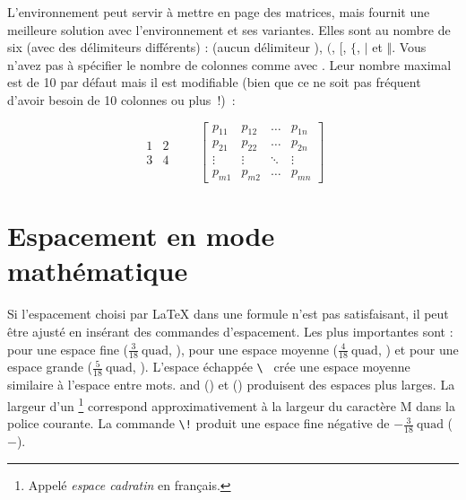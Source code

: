 L'environnement  peut servir à mettre en page des
matrices, mais  fournit une meilleure
solution avec l'environnement  et ses variantes. Elles sont au
nombre de six (avec des délimiteurs différents) :  (aucun
délimiteur ), 
$($,  $[$,  $\{$,  $\vert$ et
 $\Vert$. Vous n'avez pas à spécifier le nombre de
colonnes comme avec . Leur nombre maximal est de 10 par défaut mais il
est modifiable (bien que ce ne soit pas fréquent d'avoir besoin de 10
colonnes ou plus~!)~:
\begin{example}
\begin{equation*}
  \begin{matrix} 
    1 & 2 \\
    3 & 4 
  \end{matrix} \qquad
  \begin{bmatrix} 
    p_{11} & p_{12} & \ldots 
    & p_{1n} \\
    p_{21} & p_{22} & \ldots 
    & p_{2n} \\
    \vdots & \vdots & \ddots 
    & \vdots \\
    p_{m1} & p_{m2} & \ldots 
    & p_{mn} 
  \end{bmatrix}
\end{equation*}
\end{example}

\section{Espacement en mode mathématique}
\label{sec:math-spacing}


Si l'espacement choisi par \LaTeX{} dans une formule n'est pas
satisfaisant, il peut être ajusté en insérant des commandes
d'espacement. Les plus importantes sont : \ci{,} pour une espace fine
($\frac{3}{18}\:\textrm{quad}$, \demowidth{0.166em}), \ci{:} pour une
espace moyenne ($\frac{4}{18}\:\textrm{quad}$, \demowidth{0.222em}) et
\ci{;} pour une espace grande ($\frac{5}{18}\: \textrm{quad}$,
\demowidth{0.277em}).  L'espace échappée \verb*|\ | crée une espace
moyenne similaire à l'espace entre mots. and 
(\demowidth{1em}) et  (\demowidth{2em}) produisent des
espaces plus larges.  La largeur d'un \footnote{Appelé \emph{espace
    cadratin} en français. \NdT} correspond approximativement à la largeur du
caractère \og M \fg{} dans la police courante. 
La commande \verb|\!| produit une espace fine négative
de $-\frac{3}{18}\:\textrm{quad}$ ($-$\demowidth{0.166em}).

